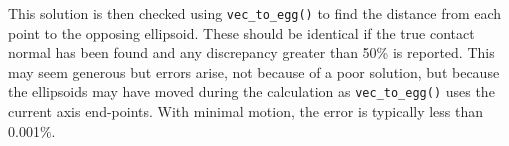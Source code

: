 {{{{{This solution is then checked using {\tt vec\_to\_egg()} to find the distance from each point to the
opposing ellipsoid.  These should be identical if the true contact normal has been found and any discrepancy
greater than 50\% is reported.  This may seem generous but errors arise, not because of a poor solution,
but because the ellipsoids may have moved during the calculation as {\tt vec\_to\_egg()} uses the current
axis end-points.  With minimal motion, the error is typically less than 0.001\%.

%
%
%
%
%
}}}}}
